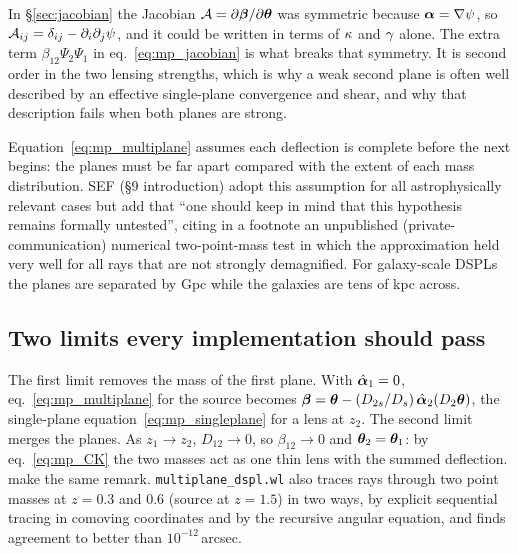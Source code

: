 \begin{bridge}
In \S\ref{sec:jacobian} the Jacobian $\mathcal{A}=\partial\boldsymbol{\beta}/\partial\boldsymbol{\theta}$
was symmetric because $\boldsymbol{\alpha}=\nabla\psi$, so
$\mathcal{A}_{ij}=\delta_{ij}-\partial_i\partial_j\psi$, and it could be
written in terms of $\kappa$ and $\gamma$ alone.  The extra term
$\beta_{12}\Psi_2\Psi_1$ in eq.~\eqref{eq:mp_jacobian} is what breaks
that symmetry.  It is second order in the two lensing strengths, which
is why a weak second plane is often well described by an
effective single-plane convergence and shear, and why that
description fails when both planes are strong.
\end{bridge}

\begin{annotation}
Equation~\eqref{eq:mp_multiplane} assumes each deflection is complete
before the next begins: the planes must be far apart compared with the
extent of each mass distribution.  SEF (\S9 introduction) adopt this
assumption for all astrophysically relevant cases but add that ``one
should keep in mind that this hypothesis remains formally untested'',
citing in a footnote an unpublished (private-communication) numerical
two-point-mass test in which the approximation held very well for all
rays that are not strongly demagnified.  For galaxy-scale DSPLs the planes are separated by
Gpc while the galaxies are tens of kpc across.
\end{annotation}

\subsection{Two limits every implementation should pass}

The first limit removes the mass of the first plane.  With
$\hat{\boldsymbol{\alpha}}_1=0$, eq.~\eqref{eq:mp_multiplane} for the
source becomes
$\boldsymbol{\beta}=\boldsymbol{\theta}-(D_{2s}/D_s)\,\hat{\boldsymbol{\alpha}}_2(D_2\boldsymbol{\theta})$,
the single-plane equation~\eqref{eq:mp_singleplane} for a lens
at $z_2$.  
The second limit merges the planes.  As $z_1\to z_2$, $D_{12}\to0$, so
$\beta_{12}\to0$ and $\boldsymbol{\theta}_2=\boldsymbol{\theta}_1$: by
eq.~\eqref{eq:mp_CK} the two masses act as one thin lens with
the summed deflection.  \citet[\S4.8]{congdon_principles_2018}
make the same remark.
\texttt{multiplane\_dspl.wl}  also traces rays through two
point masses at $z=0.3$ and $0.6$ (source at $z=1.5$) in two ways, by
explicit sequential tracing in comoving coordinates and by the recursive
angular equation, and finds agreement to better than
$10^{-12}$\,arcsec.


